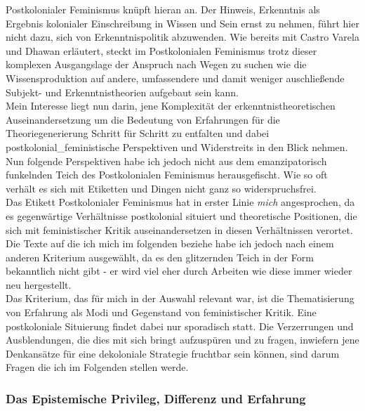 \noindent Postkolonialer Feminismus knüpft hieran an. Der Hinweis, Erkenntnis als
Ergebnis kolonialer Einschreibung in Wissen und Sein ernst zu nehmen, führt
hier nicht dazu, sich von Erkenntnispolitik abzuwenden. Wie bereits mit Castro
Varela und Dhawan erläutert, steckt im Postkolonialen Feminismus trotz dieser
komplexen Ausgangslage der Anspruch nach Wegen zu suchen wie die
Wissensproduktion auf andere, umfassendere und damit weniger auschließende
Subjekt- und Erkenntnistheorien aufgebaut sein kann. \\
Mein Interesse liegt nun
darin, jene Komplexität der erkenntnistheoretischen Auseinandersetzung um die
Bedeutung von Erfahrungen für die Theoriegenerierung Schritt für Schritt zu
entfalten und dabei postkolonial\_feministische Perspektiven und Widerstreits in
den Blick nehmen. Nun folgende Perspektiven habe ich jedoch
nicht aus dem emanzipatorisch funkelnden Teich des Postkolonialen Feminismus
herausgefischt. Wie so oft verhält es sich mit Etiketten und Dingen nicht ganz
so widerspruchsfrei.\\

\noindent Das Etikett Postkolonialer Feminismus hat in erster Linie \textit{mich} angesprochen, da
es gegenwärtige Verhältnisse postkolonial situiert und theoretische Positionen,
die sich mit feministischer Kritik auseinandersetzen in diesen Verhältnissen
verortet. \\
Die Texte auf die ich mich im folgenden beziehe habe ich jedoch nach
einem anderen Kriterium ausgewählt, da es den glitzernden Teich in der Form
bekanntlich nicht gibt - er wird viel eher durch Arbeiten wie diese immer
wieder neu hergestellt.\\
 Das Kriterium, das für mich in der Auswahl relevant
war, ist die Thematisierung von Erfahrung als Modi und Gegenstand von
feministischer Kritik. Eine postkoloniale Situierung findet dabei nur
sporadisch statt. Die Verzerrungen und Ausblendungen, die dies mit sich bringt
aufzuspüren und zu fragen, inwiefern jene Denkansätze für eine dekoloniale
Strategie fruchtbar sein können, sind darum Fragen die ich im Folgenden stellen
werde.

\subsubsection{Das Epistemische Privileg, Differenz und Erfahrung}

